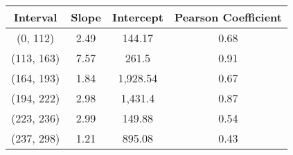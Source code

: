 \begin{tabular}{cccc}
\toprule
   Interval &  Slope & Intercept &  Pearson Coefficient \\
\midrule
   (0, 112) &   2.49 &    144.17 &                 0.68 \\
 (113, 163) &   7.57 &     261.5 &                 0.91 \\
 (164, 193) &   1.84 &  1,928.54 &                 0.67 \\
 (194, 222) &   2.98 &   1,431.4 &                 0.87 \\
 (223, 236) &   2.99 &    149.88 &                 0.54 \\
 (237, 298) &   1.21 &    895.08 &                 0.43 \\
\bottomrule
\end{tabular}
